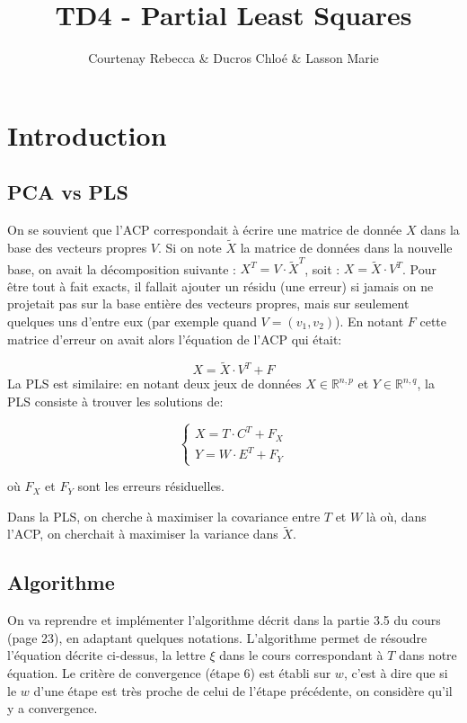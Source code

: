 \documentclass[
]{article}
\title{TD4 - Partial Least Squares}
\author{Courtenay Rebecca \& Ducros Chloé \& Lasson Marie}
\date{}
\begin{document}
\maketitle

{
\setcounter{tocdepth}{2}
\tableofcontents
}
\hypertarget{introduction}{%
\section{Introduction}\label{introduction}}

\hypertarget{pca-vs-pls}{%
\subsection{PCA vs PLS}\label{pca-vs-pls}}

On se souvient que l'ACP correspondait à écrire une matrice de donnée
\(X\) dans la base des vecteurs propres \(V\). Si on note \(\tilde X\)
la matrice de données dans la nouvelle base, on avait la décomposition
suivante : \(X^T = V \cdot \tilde X^T\), soit :
\(X = \tilde X \cdot V^T\). Pour être tout à fait exacts, il fallait
ajouter un résidu (une erreur) si jamais on ne projetait pas sur la base
entière des vecteurs propres, mais sur seulement quelques uns d'entre
eux (par exemple quand \(V=(v_1,v_2)\)). En notant \(F\) cette matrice
d'erreur on avait alors l'équation de l'ACP qui était:

\[ X = \tilde X \cdot V^T + F\] La PLS est similaire: en notant deux
jeux de données \(X \in \mathbb R^{n,p}\) et \(Y \in \mathbb R^{n,q}\),
la PLS consiste à trouver les solutions de:

\[\left\{
    \begin{array}{ll}
         X = T \cdot C^T + F_X \\
         Y = W \cdot E^T + F_Y
    \end{array}
\right.\]

où \(F_X\) et \(F_Y\) sont les erreurs résiduelles.

Dans la PLS, on cherche à maximiser la covariance entre \(T\) et \(W\)
là où, dans l'ACP, on cherchait à maximiser la variance dans
\(\tilde X\).

\hypertarget{algorithme}{%
\subsection{Algorithme}\label{algorithme}}

On va reprendre et implémenter l'algorithme décrit dans la partie 3.5 du
cours (page 23), en adaptant quelques notations. L'algorithme permet de
résoudre l'équation décrite ci-dessus, la lettre \(\xi\) dans le cours
correspondant à \(T\) dans notre équation. Le critère de convergence
(étape 6) est établi sur \(w\), c'est à dire que si le \(w\) d'une étape
est très proche de celui de l'étape précédente, on considère qu'il y a
convergence.
\end{document}
